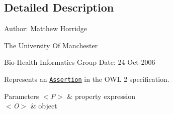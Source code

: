 \subsection{Detailed Description}
Author\-: Matthew Horridge\par
 The University Of Manchester\par
 Bio-\/\-Health Informatics Group Date\-: 24-\/\-Oct-\/2006

Represents an \href{http://www.w3.org/TR/2009/REC-owl2-syntax-20091027/#Assertions}{\tt Assertion} in the O\-W\-L 2 specification.


\begin{DoxyParams}{Parameters}
{\em $<$\-P$>$} & property expression \\
\hline
{\em $<$\-O$>$} & object \\
\hline
\end{DoxyParams}


